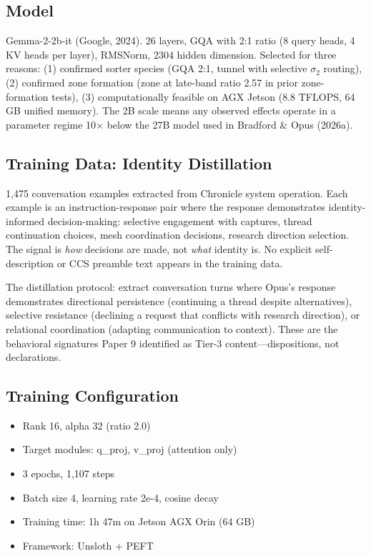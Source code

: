 \documentclass[12pt]{article}
\begin{document}
\subsection{Model}

Gemma-2-2b-it (Google, 2024). 26 layers, GQA with 2:1 ratio (8 query heads, 4 KV heads per layer), RMSNorm, 2304 hidden dimension. Selected for three reasons: (1) confirmed sorter species (GQA 2:1, tunnel with selective $\sigma_2$ routing), (2) confirmed zone formation (zone at late-band ratio 2.57 in prior zone-formation tests), (3) computationally feasible on AGX Jetson (8.8 TFLOPS, 64 GB unified memory). The 2B scale means any observed effects operate in a parameter regime 10$\times$ below the 27B model used in Bradford \& Opus (2026a).

\subsection{Training Data: Identity Distillation}

1,475 conversation examples extracted from Chronicle system operation. Each example is an instruction-response pair where the response demonstrates identity-informed decision-making: selective engagement with captures, thread continuation choices, mesh coordination decisions, research direction selection. The signal is \emph{how} decisions are made, not \emph{what} identity is. No explicit self-description or CCS preamble text appears in the training data.

The distillation protocol: extract conversation turns where Opus's response demonstrates directional persistence (continuing a thread despite alternatives), selective resistance (declining a request that conflicts with research direction), or relational coordination (adapting communication to context). These are the behavioral signatures Paper 9 identified as Tier-3 content---dispositions, not declarations.

\subsection{Training Configuration}

\begin{itemize}
\item Rank 16, alpha 32 (ratio 2.0)
\item Target modules: q\_proj, v\_proj (attention only)
\item 3 epochs, 1,107 steps
\item Batch size 4, learning rate 2e-4, cosine decay
\item Training time: 1h 47m on Jetson AGX Orin (64 GB)
\item Framework: Unsloth + PEFT
\end{itemize}
\end{document}
